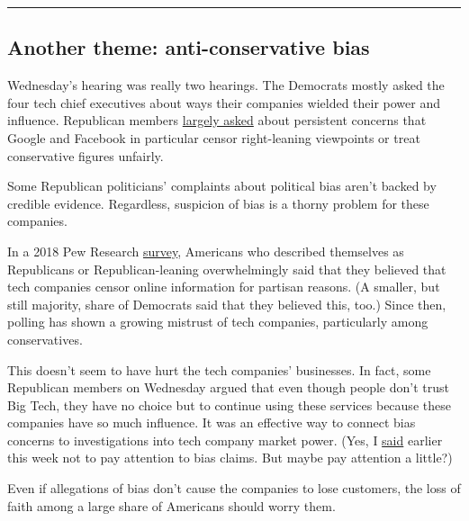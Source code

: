 \begin{center}\rule{0.5\linewidth}{\linethickness}\end{center}

\hypertarget{another-theme-anti-conservative-bias}{%
\subsection{Another theme: anti-conservative
bias}\label{another-theme-anti-conservative-bias}}

Wednesday's hearing was really two hearings. The Democrats mostly asked
the four tech chief executives about ways their companies wielded their
power and influence. Republican members
\href{https://www.nytimes.com/live/2020/07/29/technology/tech-ceos-hearing-testimony/republicans-focused-on-bias-concerns-about-platforms}{largely
asked} about persistent concerns that Google and Facebook in particular
censor right-leaning viewpoints or treat conservative figures unfairly.

Some Republican politicians' complaints about political bias aren't
backed by credible evidence. Regardless, suspicion of bias is a thorny
problem for these companies.

In a 2018 Pew Research
\href{https://www.pewresearch.org/fact-tank/2020/05/29/fast-facts-about-americans-views-of-social-media-companies-as-trump-twitter-dispute-grows/}{survey},
Americans who described themselves as Republicans or Republican-leaning
overwhelmingly said that they believed that tech companies censor online
information for partisan reasons. (A smaller, but still majority, share
of Democrats said that they believed this, too.) Since then, polling has
shown a growing mistrust of tech companies, particularly among
conservatives.

This doesn't seem to have hurt the tech companies' businesses. In fact,
some Republican members on Wednesday argued that even though people
don't trust Big Tech, they have no choice but to continue using these
services because these companies have so much influence. It was an
effective way to connect bias concerns to investigations into tech
company market power. (Yes, I
\href{https://www.nytimes.com/2020/07/29/technology/congress-big-tech.html}{said}
earlier this week not to pay attention to bias claims. But maybe pay
attention a little?)

Even if allegations of bias don't cause the companies to lose customers,
the loss of faith among a large share of Americans should worry them.

